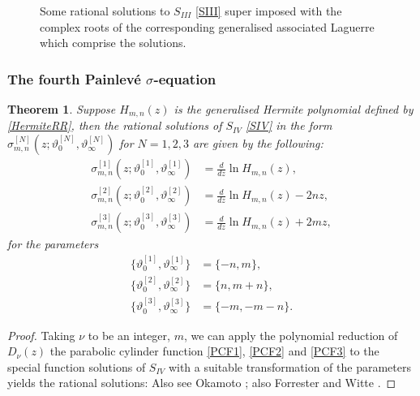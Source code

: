 \documentclass[12pt]{article}
\def\P{Painlev\'e }
\newtheorem{mydef}{Theorem}[section]
\numberwithin{figure}{section}
\numberwithin{equation}{section}
\numberwithin{table}{section}
\begin{document}
\begin{figure}[H]
\centering
{}
\caption{Some rational solutions to $S_{III}$ \eqref{SIII} super imposed with the complex roots of the corresponding generalised associated Laguerre which comprise the solutions.}
\end{figure}

\subsubsection{The fourth \P $\sigma$-equation}
\begin{mydef}
Suppose $H_{m,n}(z)$ is the generalised Hermite polynomial defined by \eqref{HermiteRR}, then the rational solutions of $S_{IV}$ \eqref{SIV} in the form $\sigma^{[N]}_{m,n}(z;\vartheta_0^{[N]},\vartheta_\infty^{[N]})$ for $N=1,2,3$ are given by the following:
\begin{subequations}
\begin{align}
\sigma^{[1]}_{m,n}(z;\vartheta_0^{[1]},\vartheta_\infty^{[1]})&=\frac{d}{dz}\ln H_{m,n}(z),\\
\sigma^{[2]}_{m,n}(z;\vartheta_0^{[2]},\vartheta_\infty^{[2]})&=\frac{d}{dz}\ln H_{m,n}(z)-2nz,\\
\sigma^{[3]}_{m,n}(z;\vartheta_0^{[3]},\vartheta_\infty^{[3]})&=\frac{d}{dz}\ln H_{m,n}(z)+2mz,
\end{align}
\end{subequations}
for the parameters
\begin{subequations}
\begin{align}
\{\vartheta_0^{[1]},\vartheta_\infty^{[1]}\}&=\{-n,m\},\\
\{\vartheta_0^{[2]},\vartheta_\infty^{[2]}\}&=\{n,m+n\},\\
\{\vartheta_0^{[3]},\vartheta_\infty^{[3]}\}&=\{-m,-m-n\}.\label{S3TH}
\end{align}
\end{subequations}
\end{mydef}
\begin{proof}
Taking $\nu$ to be an integer, $m$, we can apply the polynomial reduction of $D_\nu(z)$ the parabolic cylinder function \eqref{PCF1}, \eqref{PCF2} and \eqref{PCF3} to the special function solutions of $S_{IV}$ with a suitable transformation of the parameters yields the rational solutions: Also see Okamoto \cite{P:275:221}; also Forrester and Witte \cite{P:219:357}.
\end{proof}
\end{document}
